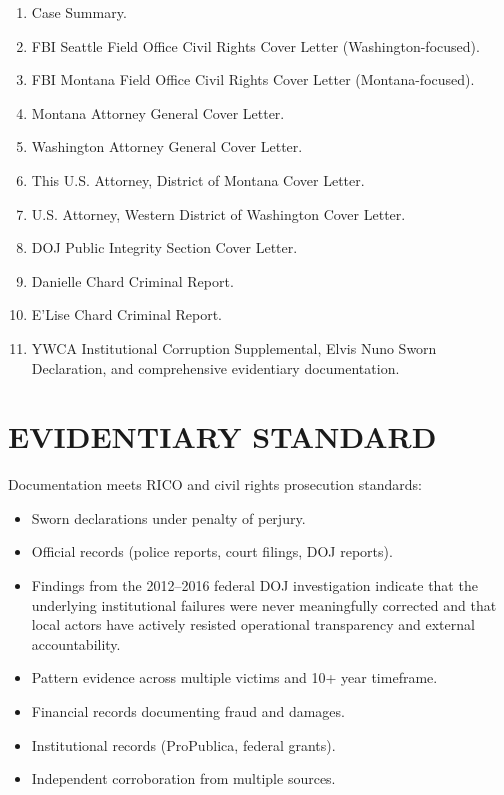 \documentclass[12pt,oneside]{article}
\begin{document}
\begin{flushleft}
\begin{enumerate}
\item Case Summary.
\item FBI Seattle Field Office Civil Rights Cover Letter (Washington-focused).
\item FBI Montana Field Office Civil Rights Cover Letter (Montana-focused).
\item Montana Attorney General Cover Letter.
\item Washington Attorney General Cover Letter.
\item This U.S. Attorney, District of Montana Cover Letter.
\item U.S. Attorney, Western District of Washington Cover Letter.
\item DOJ Public Integrity Section Cover Letter.
\item Danielle Chard Criminal Report.
\item E'Lise Chard Criminal Report.
\item YWCA Institutional Corruption Supplemental, Elvis Nuno Sworn Declaration, and comprehensive evidentiary documentation.
\end{enumerate}

\section*{EVIDENTIARY STANDARD}

Documentation meets RICO and civil rights prosecution standards:

\begin{itemize}
\item Sworn declarations under penalty of perjury.
\item Official records (police reports, court filings, DOJ reports).
\item Findings from the 2012–2016 federal DOJ investigation indicate that the underlying institutional failures were never meaningfully corrected and that local actors have actively resisted operational transparency and external accountability.
\item Pattern evidence across multiple victims and 10+ year timeframe.
\item Financial records documenting fraud and damages.
\item Institutional records (ProPublica, federal grants).
\item Independent corroboration from multiple sources.
\end{itemize}


\end{flushleft}
\end{document}
